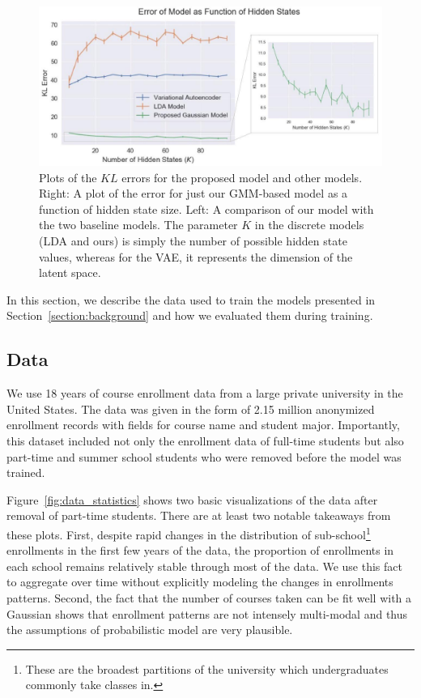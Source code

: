\documentclass{edm_template}
\begin{document}
\begin{figure}[h]
    \centering
    \includegraphics[width=0.9\linewidth]{figures/kl_error.jpg}
    
    \caption{Plots of the $KL$ errors for the proposed model and other models. Right: A plot of the error for just our GMM-based model as a function of hidden state size. Left: A comparison of our model with the two baseline models. The parameter $K$ in the discrete models (LDA and ours) is simply the number of possible hidden state values, whereas for the VAE, it represents the dimension of the latent space.}
    \label{fig:kl_plot}
\end{figure}

In this section, we describe the data used to train the models presented in Section~\ref{section:background} and how we evaluated them during training. 

\subsection{Data}

We use 18 years of course enrollment data from a large private university in the United States. The data was given in the form of 2.15 million anonymized enrollment records with fields for course name and student major. Importantly, this dataset included not only the enrollment data of full-time students but also part-time and summer school students who were removed before the model was trained. 

Figure~\ref{fig:data_statistics} shows two basic visualizations of the data after removal of part-time students. There are at least two notable takeaways from these plots. First, despite rapid changes in the distribution of sub-school\footnote{These are the broadest partitions of the university which undergraduates commonly take classes in.} enrollments in the first few years of the data, the proportion of enrollments in each school remains relatively stable through most of the data. We use this fact to aggregate over time without explicitly modeling the changes in enrollments patterns. Second, the fact that the number of courses taken can be fit well with a Gaussian shows that enrollment patterns are not intensely multi-modal and thus the assumptions of probabilistic model are very plausible.
\end{document}
